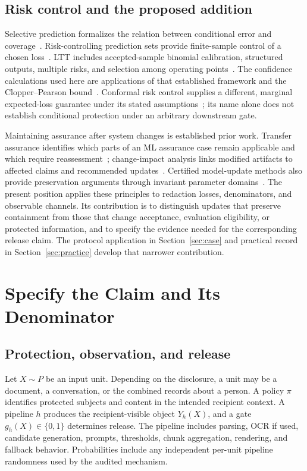 \documentclass[conference]{IEEEtran}
\begin{document}
\subsection{Risk control and the proposed addition}
Selective prediction formalizes the relation between conditional error and coverage~\cite{elyaniv2010,geifman2017}. Risk-controlling prediction sets provide finite-sample control of a chosen loss~\cite{bates2021}. LTT includes accepted-sample binomial calibration, structured outputs, multiple risks, and selection among operating points~\cite{angelopoulos2025}. The confidence calculations used here are applications of that established framework and the Clopper--Pearson bound~\cite{clopper1934}. Conformal risk control supplies a different, marginal expected-loss guarantee under its stated assumptions~\cite{angelopoulos2024}; its name alone does not establish conditional protection under an arbitrary downstream gate.

Maintaining assurance after system changes is established prior work. Transfer assurance identifies which parts of an ML assurance case remain applicable and which require reassessment~\cite{picardi2023}; change-impact analysis links modified artifacts to affected claims and recommended updates~\cite{carlan2022}. Certified model-update methods also provide preservation arguments through invariant parameter domains~\cite{elmecker2026}. The present position applies these principles to redaction losses, denominators, and observable channels. Its contribution is to distinguish updates that preserve containment from those that change acceptance, evaluation eligibility, or protected information, and to specify the evidence needed for the corresponding release claim. The protocol application in Section~\ref{sec:case} and practical record in Section~\ref{sec:practice} develop that narrower contribution.

\section{Specify the Claim and Its Denominator}
\subsection{Protection, observation, and release}
Let $X\sim P$ be an input unit. Depending on the disclosure, a unit may be a document, a conversation, or the combined records about a person. A policy $\pi$ identifies protected subjects and content in the intended recipient context. A pipeline $h$ produces the recipient-visible object $Y_h(X)$, and a gate $g_h(X)\in\{0,1\}$ determines release. The pipeline includes parsing, OCR if used, candidate generation, prompts, thresholds, chunk aggregation, rendering, and fallback behavior. Probabilities include any independent per-unit pipeline randomness used by the audited mechanism.
\end{document}
